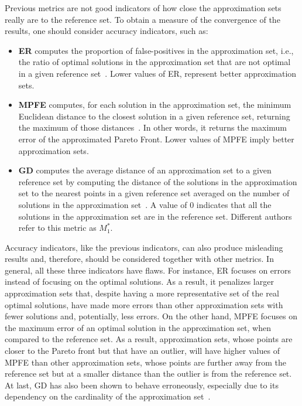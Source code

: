 	Previous metrics are not good indicators of how close the approximation sets really are to the reference set. To obtain a measure of the convergence of the results, one should consider accuracy indicators, such as:
	\begin{itemize}
		\item \textbf{\ac{ER}} computes the proportion of false-positives in the approximation set, i.e., the ratio of optimal solutions in the approximation set that are not optimal in a given reference set~\cite{Veldhuizen1999GD}. Lower values of \ac{ER}, represent better approximation sets. 
		\item \textbf{\ac{MPFE}} computes, for each solution in the approximation set, the minimum Euclidean distance to the closest solution in a given reference set, returning the maximum of those distances~\cite{Veldhuizen1999GD}. In other words, it returns the maximum error of the approximated Pareto Front. Lower values of \ac{MPFE} imply better approximation sets. 
		\item \textbf{\ac{GD}} computes the average distance of an approximation set to a given reference set by computing the distance of the solutions in the approximation set to the nearest points in a given reference set averaged on the number of solutions in the approximation set~\cite{Veldhuizen1999GD}. A value of $0$ indicates that all the solutions in the approximation set are in the reference set. Different authors\cite{Zitzler2000m1m3} refer to this metric as \textbf{$M_1^\ast$}.
	\end{itemize}
	
	Accuracy indicators, like the previous indicators, can also produce misleading results and, therefore, should be considered together with other metrics. In general, all these three indicators have flaws. For instance, \ac{ER} focuses on errors instead of focusing on the optimal solutions. As a result, it penalizes larger approximation sets that, despite having a more representative set of the real optimal solutions, have made more errors than other approximation sets with fewer solutions and, potentially, less errors. On the other hand, \ac{MPFE} focuses on the maximum error of an optimal solution in the approximation set, when compared to the reference set. As a result, approximation sets, whose points are closer to the Pareto front but that have an outlier, will have higher values of \ac{MPFE} than other approximation sets, whose points are further away from the reference set but at a smaller distance than the outlier is from the reference set. At last, \ac{GD} has also been shown to behave erroneously, especially due to its dependency on the cardinality of the approximation set~\cite{Ishibuchi2005GDIGD}.
	
